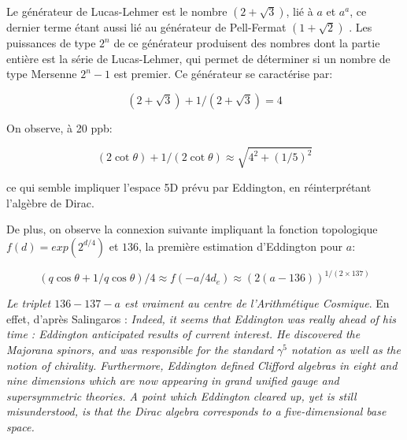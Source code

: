 \documentclass[a4paper,9pt]{article}
\begin{document}
Le générateur de Lucas-Lehmer est le nombre $(2 + \sqrt 3)$, lié à $a$ et $a^a$, ce dernier terme étant aussi lié au générateur de Pell-Fermat $(1 + \sqrt2)$ \cite{Sanchez2}. Les puissances de type $2^n$ de ce générateur produisent des nombres dont la partie entière est la série de Lucas-Lehmer, qui permet de déterminer si un nombre de type Mersenne $2^n-1$ est premier. Ce générateur se caractérise par:


\begin{equation}
(2 + \sqrt 3) + 1/ (2 + \sqrt 3) = 4
\end{equation}


On observe, à 20 ppb:

\begin{equation}
(2\cot\theta) + 1/(2\cot\theta) \approx \sqrt{4^2 + (1/5)^2}
\end{equation}

ce qui semble impliquer l'espace 5D prévu par Eddington, en réinterprétant l'algèbre de Dirac.

De plus, on observe la connexion suivante impliquant la fonction topologique $f(d) = exp(2^{d/4})$ et $136$, la première estimation
d'Eddington pour $a$:

\begin{equation}
(q\cos\theta + 1/q\cos\theta )/4 \approx f(-a/4d_e)    \approx (2(a-136))^{1/(2\times 137)}
\end{equation}




\textit{Le triplet $136-137-a$ est vraiment au centre de l'Arithmétique Cosmique}. En effet, d'après Salingaros \cite{Salingaros}: \textit{Indeed, it seems that Eddington was really ahead of his time : Eddington anticipated results of current interest. He discovered the Majorana spinors, and was responsible for the standard $\gamma^5$ notation as well as the notion of chirality. Furthermore, Eddington defined Clifford algebras in eight and nine dimensions which are now appearing in grand unified gauge and supersymmetric theories. A point which Eddington cleared up, yet is still misunderstood, is that the Dirac algebra corresponds to a five-dimensional base space.}
\end{document}
